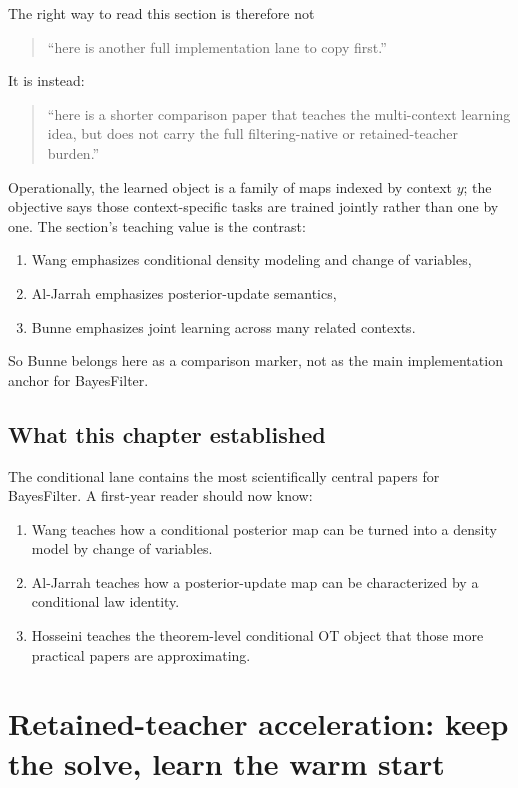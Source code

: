\documentclass[11pt]{report}
\begin{document}
The right way to read this section is therefore not
\begin{quote}
``here is another full implementation lane to copy first.''
\end{quote}
It is instead:
\begin{quote}
``here is a shorter comparison paper that teaches the multi-context learning idea,
but does not carry the full filtering-native or retained-teacher burden.''
\end{quote}

Operationally, the learned object is a family of maps indexed by context $y$; the
objective says those context-specific tasks are trained jointly rather than one by
one.  The section's teaching value is the contrast:
\begin{enumerate}[label=(\roman*)]
  \item Wang emphasizes conditional density modeling and change of variables,
  \item Al-Jarrah emphasizes posterior-update semantics,
  \item Bunne emphasizes joint learning across many related contexts.
\end{enumerate}
So Bunne belongs here as a comparison marker, not as the main implementation anchor
for BayesFilter.

\section{What this chapter established}

The conditional lane contains the most scientifically central papers for
BayesFilter.  A first-year reader should now know:
\begin{enumerate}[label=(\arabic*)]
  \item Wang teaches how a conditional posterior map can be turned into a density
  model by change of variables.
  \item Al-Jarrah teaches how a posterior-update map can be characterized by a
  conditional law identity.
  \item Hosseini teaches the theorem-level conditional OT object that those more
  practical papers are approximating.
\end{enumerate}

\chapter{Retained-teacher acceleration: keep the solve, learn the warm start}
\end{document}
